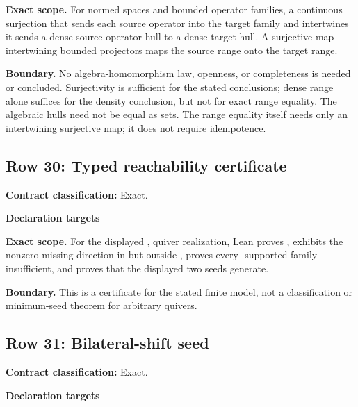 \medskip\noindent\textbf{Exact scope.} For normed spaces and bounded operator families, a continuous surjection that sends each source operator into the target family and intertwines it sends a dense source operator hull to a dense target hull. A surjective map intertwining bounded projectors maps the source range onto the target range.
\par\smallskip\noindent\textbf{Boundary.} No algebra-homomorphism law, openness, or completeness is needed or concluded. Surjectivity is sufficient for the stated conclusions; dense range alone suffices for the density conclusion, but not for exact range equality. The algebraic hulls need not be equal as sets. The range equality itself needs only an intertwining surjective map; it does not require idempotence.
\medskip
{}\subsection{Row 30: Typed reachability certificate}
\label{row:30}
\textbf{Contract classification:} Exact.
\par\smallskip\textbf{Declaration targets}\par
{\small\noindent{}\par}
\medskip\noindent\textbf{Exact scope.} For the displayed ,  quiver realization, Lean proves , exhibits the nonzero missing direction in  but outside , proves every -supported family insufficient, and proves that the displayed two seeds generate.
\par\smallskip\noindent\textbf{Boundary.} This is a certificate for the stated finite model, not a classification or minimum-seed theorem for arbitrary quivers.
\medskip
{}\subsection{Row 31: Bilateral-shift seed}
\label{row:31}
\textbf{Contract classification:} Exact.
\par\smallskip\textbf{Declaration targets}\par
{\small\noindent{}\par}
{\small\noindent{}\par}
